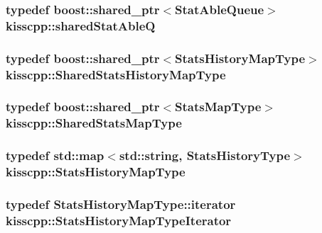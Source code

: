 \hypertarget{a00089_a141592ccd82280d2692ca3b9b490faab}{
\subsubsection[{shared\-Stat\-Able\-Q}]{\setlength{\rightskip}{0pt plus 5cm}typedef boost\-::shared\-\_\-ptr$<${\bf Stat\-Able\-Queue}$>$ {\bf kisscpp\-::shared\-Stat\-Able\-Q}}}\label{a00089_a141592ccd82280d2692ca3b9b490faab}
\hypertarget{a00089_afa626c76d3dca5d5e1be4146f211fefa}{
\subsubsection[{Shared\-Stats\-History\-Map\-Type}]{\setlength{\rightskip}{0pt plus 5cm}typedef boost\-::shared\-\_\-ptr$<${\bf Stats\-History\-Map\-Type}$>$ {\bf kisscpp\-::\-Shared\-Stats\-History\-Map\-Type}}}\label{a00089_afa626c76d3dca5d5e1be4146f211fefa}
\hypertarget{a00089_aec223e8bce5f3988c62ceb0ccad11a68}{
\subsubsection[{Shared\-Stats\-Map\-Type}]{\setlength{\rightskip}{0pt plus 5cm}typedef boost\-::shared\-\_\-ptr$<${\bf Stats\-Map\-Type}$>$ {\bf kisscpp\-::\-Shared\-Stats\-Map\-Type}}}\label{a00089_aec223e8bce5f3988c62ceb0ccad11a68}
\hypertarget{a00089_a8dbb864ea5d1e1fae0d3a1435bd295e7}{
\subsubsection[{Stats\-History\-Map\-Type}]{\setlength{\rightskip}{0pt plus 5cm}typedef std\-::map$<$std\-::string, {\bf Stats\-History\-Type}$>$ {\bf kisscpp\-::\-Stats\-History\-Map\-Type}}}\label{a00089_a8dbb864ea5d1e1fae0d3a1435bd295e7}
\hypertarget{a00089_ae45d7146f3abe3c95364c6ea280f7487}{
\subsubsection[{Stats\-History\-Map\-Type\-Iterator}]{\setlength{\rightskip}{0pt plus 5cm}typedef Stats\-History\-Map\-Type\-::iterator {\bf kisscpp\-::\-Stats\-History\-Map\-Type\-Iterator}}}\label{a00089_ae45d7146f3abe3c95364c6ea280f7487}
